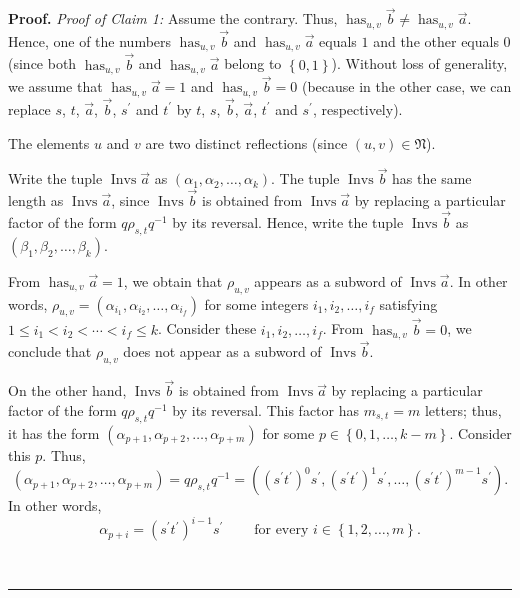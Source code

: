 \documentclass
[numbers=enddot,12pt,final,onecolumn,notitlepage,abstracton]{scrartcl}%
\theoremstyle{definition}
\newenvironment{proof}[1][Proof]{\noindent\textbf{#1.} }{\ \rule{0.5em}{0.5em}}
\begin{document}
\begin{proof}
\textit{Proof of Claim 1:} Assume the contrary. Thus, $\operatorname*{has}%
\nolimits_{u,v}\overrightarrow{b}\neq\operatorname*{has}\nolimits_{u,v}%
\overrightarrow{a}$. Hence, one of the numbers $\operatorname*{has}%
\nolimits_{u,v}\overrightarrow{b}$ and $\operatorname*{has}\nolimits_{u,v}%
\overrightarrow{a}$ equals $1$ and the other equals $0$ (since both
$\operatorname*{has}\nolimits_{u,v}\overrightarrow{b}$ and
$\operatorname*{has}\nolimits_{u,v}\overrightarrow{a}$ belong to $\left\{
0,1\right\}  $). Without loss of generality, we assume that
$\operatorname*{has}\nolimits_{u,v}\overrightarrow{a}=1$ and
$\operatorname*{has}\nolimits_{u,v}\overrightarrow{b}=0$ (because in the other
case, we can replace $s$, $t$, $\overrightarrow{a}$, $\overrightarrow{b}$,
$s^{\prime}$ and $t^{\prime}$ by $t$, $s$, $\overrightarrow{b}$,
$\overrightarrow{a}$, $t^{\prime}$ and $s^{\prime}$, respectively).

The elements $u$ and $v$ are two distinct reflections (since $\left(
u,v\right)  \in\mathfrak{N}$).

Write the tuple $\operatorname*{Invs}\overrightarrow{a}$ as $\left(
\alpha_{1},\alpha_{2},\ldots,\alpha_{k}\right)  $. The tuple
$\operatorname*{Invs}\overrightarrow{b}$ has the same length as
$\operatorname*{Invs}\overrightarrow{a}$, since $\operatorname*{Invs}%
\overrightarrow{b}$ is obtained from $\operatorname*{Invs}\overrightarrow{a}$
by replacing a particular factor of the form $q\rho_{s,t}q^{-1}$ by its
reversal. Hence, write the tuple $\operatorname*{Invs}\overrightarrow{b}$ as
$\left(  \beta_{1},\beta_{2},\ldots,\beta_{k}\right)  $.

From $\operatorname*{has}\nolimits_{u,v}\overrightarrow{a}=1$, we obtain that
$\rho_{u,v}$ appears as a subword of $\operatorname*{Invs}\overrightarrow{a}$.
In other words, $\rho_{u,v}=\left(  \alpha_{i_{1}},\alpha_{i_{2}}%
,\ldots,\alpha_{i_{f}}\right)  $ for some integers $i_{1},i_{2},\ldots,i_{f}$
satisfying $1\leq i_{1}<i_{2}<\cdots<i_{f}\leq k$. Consider these $i_{1}%
,i_{2},\ldots,i_{f}$. From $\operatorname*{has}\nolimits_{u,v}%
\overrightarrow{b}=0$, we conclude that $\rho_{u,v}$ does not appear as a
subword of $\operatorname*{Invs}\overrightarrow{b}$.

On the other hand, $\operatorname*{Invs}\overrightarrow{b}$ is obtained from
$\operatorname*{Invs}\overrightarrow{a}$ by replacing a particular factor of
the form $q\rho_{s,t}q^{-1}$ by its reversal. This factor has $m_{s,t}=m$
letters; thus, it has the form $\left(  \alpha_{p+1},\alpha_{p+2}%
,\ldots,\alpha_{p+m}\right)  $ for some $p\in\left\{  0,1,\ldots,k-m\right\}
$. Consider this $p$. Thus,%
\[
\left(  \alpha_{p+1},\alpha_{p+2},\ldots,\alpha_{p+m}\right)  =q\rho
_{s,t}q^{-1}=\left(  \left(  s^{\prime}t^{\prime}\right)  ^{0}s^{\prime
},\left(  s^{\prime}t^{\prime}\right)  ^{1}s^{\prime},\ldots,\left(
s^{\prime}t^{\prime}\right)  ^{m-1}s^{\prime}\right)  .
\]
In other words,%
\begin{equation}
\alpha_{p+i}=\left(  s^{\prime}t^{\prime}\right)  ^{i-1}s^{\prime
}\ \ \ \ \ \ \ \ \ \ \text{for every }i\in\left\{  1,2,\ldots,m\right\}  .
\label{pf.thm.has.c1.2}%
\end{equation}



\end{proof}
\end{document}
